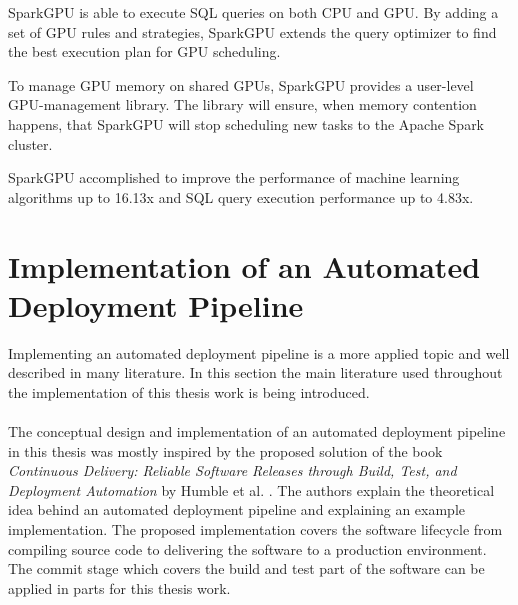 SparkGPU is able to execute SQL queries on both CPU and GPU.
By adding a set of GPU rules and strategies, SparkGPU extends the query optimizer to find the best execution plan for GPU scheduling.

To manage GPU memory on shared GPUs, SparkGPU provides a user-level GPU-management library.
The library will ensure, when memory contention happens, that SparkGPU will stop scheduling new tasks to the Apache Spark cluster.

SparkGPU accomplished to improve the performance of machine learning algorithms up to 16.13x and SQL query execution performance up to 4.83x.


\section{Implementation of an Automated Deployment Pipeline}
Implementing an automated deployment pipeline is a more applied topic and well described in many literature. In this section the main literature used throughout the implementation of this thesis work is being introduced.


\paragraph{}The conceptual design and implementation of an automated deployment pipeline in this thesis was mostly inspired by the proposed solution of the book \textit{Continuous Delivery: Reliable Software Releases through Build, Test, and Deployment Automation} by Humble et al. \cite{Farley2010CI}.
The authors explain the theoretical idea behind an automated deployment pipeline and explaining an example implementation.
The proposed implementation covers the software lifecycle from compiling source code to delivering the software to a production environment.
The commit stage which covers the build and test part of the software can be applied in parts for this thesis work.
